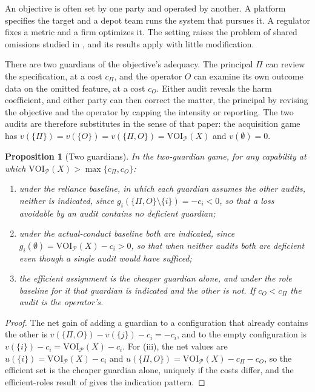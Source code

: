 \documentclass[11pt]{article}
\newcommand{\VOI}{\mathrm{VOI}}
\theoremstyle{plain}
\newtheorem{proposition}{Proposition}
\theoremstyle{definition}
\begin{document}
An objective is often set by one party and operated by another. A platform specifies the target and a depot team runs the system that pursues it. A regulator fixes a metric and a firm optimizes it. The setting raises the problem of shared omissions studied in \cite{flyxion2026shared}, and its results apply with little modification.

There are two guardians of the objective's adequacy. The principal $\Pi$ can review the specification, at a cost $c_\Pi$, and the operator $O$ can examine its own outcome data on the omitted feature, at a cost $c_O$. Either audit reveals the harm coefficient, and either party can then correct the matter, the principal by revising the objective and the operator by capping the intensity or reporting. The two audits are therefore substitutes in the sense of that paper: the acquisition game has $v(\{\Pi\})=v(\{O\})=v(\{\Pi,O\})=\VOI_{\mathcal P}(X)$ and $v(\emptyset)=0$.

\begin{proposition}[Two guardians]\label{prop:guardians}
In the two-guardian game, for any capability at which $\VOI_{\mathcal P}(X)>\max\{c_\Pi,c_O\}$:
\begin{enumerate}[label=(\roman*),nosep]
\item under the reliance baseline, in which each guardian assumes the other audits, neither is indicated, since $g_i(\{\Pi,O\}\setminus\{i\})=-c_i<0$, so that a loss avoidable by an audit contains no deficient guardian;
\item under the actual-conduct baseline both are indicated, since $g_i(\emptyset)=\VOI_{\mathcal P}(X)-c_i>0$, so that when neither audits both are deficient even though a single audit would have sufficed;
\item the efficient assignment is the cheaper guardian alone, and under the role baseline for it that guardian is indicated and the other is not. If $c_O<c_\Pi$ the audit is the operator's.
\end{enumerate}
\end{proposition}

\begin{proof}
The net gain of adding a guardian to a configuration that already contains the other is $v(\{\Pi,O\})-v(\{j\})-c_i=-c_i$, and to the empty configuration is $v(\{i\})-c_i=\VOI_{\mathcal P}(X)-c_i$. For (iii), the net values are $u(\{i\})=\VOI_{\mathcal P}(X)-c_i$ and $u(\{\Pi,O\})=\VOI_{\mathcal P}(X)-c_\Pi-c_O$, so the efficient set is the cheaper guardian alone, uniquely if the costs differ, and the efficient-roles result of \cite{flyxion2026shared} gives the indication pattern.
\end{proof}
\end{document}
